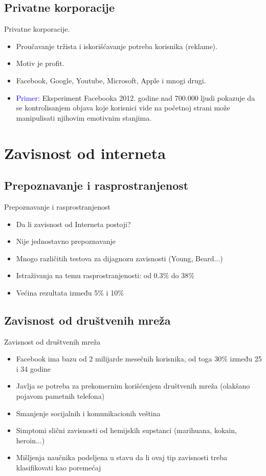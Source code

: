 \documentclass{beamer}
\begin{document}
			\subsection*{Privatne korporacije}
			\begin{frame}{Privatne korporacije.}
			\begin{itemize}
				\item Proučavanje tržista i iskorišćavanje potreba korisnika (reklame).
				\item Motiv je profit.
				\item Facebook, Google, Youtube, Microsoft, Apple i mnogi drugi.
				\item \textcolor{blue}{Primer:} Eksperiment Facebooka 2012. godine nad 700.000 ljudi pokazuje da se kontrolisanjem objava koje korisnici vide na početnoj strani može manipulisati njihovim emotivnim stanjima.
			 \end{itemize}
			\end{frame}		
		
	\section{Zavisnost od interneta}
		\subsection*{Prepoznavanje i rasprostranjenost}
			\begin{frame}{Prepoznavanje i rasprostranjenost}
				\begin{itemize}
					\item Da li zavisnost od Interneta postoji?
					\item Nije jednostavno prepoznavanje
					\item Mnogo različitih testova za dijagnozu zavisnosti (Young, Beard...)
					\item Istraživanja na temu rasprostranjenosti: od 0.3\% do 38\%
					\item Većina rezultata između 5\% i 10\%
				\end{itemize}
			\end{frame}
	
		\subsection*{Zavisnost od društvenih mreža}
			\begin{frame}{Zavisnost od društvenih mreža}
				\begin{itemize}
				\item Facebook ima bazu od 2 milijarde mesečnih korisnika, od toga 30\% između 25 i 34 godine
				\item Javlja se potreba za prekomernim korišćenjem društvenih mreža (olakšano pojavom pametnih telefona)
				\item Smanjenje socijalnih i komunikacionih veština
				\item Simptomi slični zavisnosti od hemijskih supstanci (marihuana, kokain, heroin...)
				\item Mišljenja naučnika podeljena u stavu da li ovaj tip zavisnosti treba klasifikovati kao poremećaj
				\end{itemize}
			\end{frame}
\end{document}
